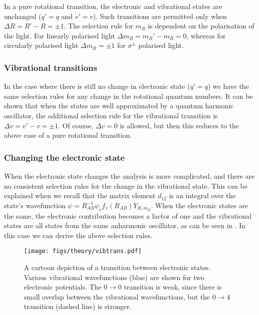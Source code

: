 In a pure rotational transition, the electronic and vibrational states are
unchanged ($q'=q$ and $v'=v$). Such transitions are permitted only when $\Delta
R = R' - R = \pm1$. The selection rule for $m_R$ is dependent on the
polarisation of the light. For linearly polarised light $\Delta m_R = m_R' -
m_R = 0$, whereas for circularly polarised light $\Delta m_R =  \pm1$ for
$\sigma^\pm$ polarised light.

\subsubsection{Vibrational transitions}

In the case where there is still no change in electronic state ($q'=q$) we have
the same selection rules for any change in the rotational quantum numbers. It
can be shown that when the states are well approximated by a quantum harmonic
oscillator, the additional selection rule for the vibrational transition
is $\Delta v = v' - v = \pm 1$. Of course, $\Delta v = 0$ is allowed, but then
this reduces to the above case of a pure rotational transition.

\subsubsection{Changing the electronic state}

When the electronic state changes the analysis is more complicated, and there
are no consistent selection rules for the change in the vibrational state. This
can be explained when we recall that the matrix element $d_{12}$ is an integral
over the state's wavefunction $\psi = R_{AB}^{-1}\psi_ef_v(R_{AB}) Y_{R, m_R}$.
When the electronic states are the same, the electronic contribution becomes a
factor of one and the vibrational states are all states from the same
anharmonic oscillator, as can be seen in . In
this case we can derive the above selection rules.

\begin{figure}
  \centering
  \texttt{[image: figs/theory/vibtrans.pdf]}
  \caption[An electronic transition in a diatomic molecule]{
    A cartoon depiction of a transition between electronic states. Various
    vibrational wavefunctions (blue) are shown for two electronic potentials.
    The $0\rightarrow0$ transition is weak, since there is small overlap
    between the vibrational wavefunctions, but the $0\rightarrow4$ transition
    (dashed line) is stronger.
  }
  \label{theory:fig:vibtrans}
\end{figure}

